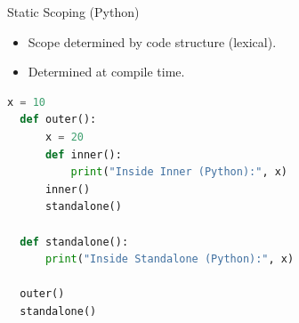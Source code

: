   \begin{frame}[fragile]{Static Scoping (Python)}
    \begin{itemize}
      \item Scope determined by code structure (lexical).
      \item Determined at compile time.
    \end{itemize}
    \begin{lstlisting}[language=Python]
  x = 10
  def outer():
      x = 20
      def inner():
          print("Inside Inner (Python):", x)
      inner()
      standalone()
  
  def standalone():
      print("Inside Standalone (Python):", x)
  
  outer()
  standalone()
    \end{lstlisting}
  \end{frame}



   

